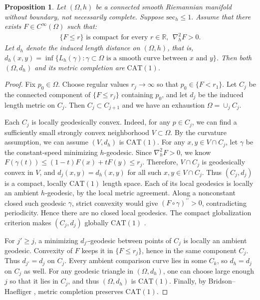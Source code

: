 \documentclass[letterpaper]{amsart}
\newtheorem{prop}[thm]{Proposition}
\theoremstyle{definition}
\theoremstyle{remark}
\begin{document}
\begin{prop}\label{prop-convex-exhaustion}
	Let $(\Omega , h)$ be a connected smooth Riemannian manifold without boundary, not necessarily complete. Suppose $\mathrm{sec}_{h} \leq 1.$ 
Assume that there exists $F \in C ^{\infty}(\Omega )$ such that:
\begin{align*}
	\{F \leq r\} \text{ is compact for every } r \in \mathbb{R},\ \ \nabla ^2_{h} F >0.
\end{align*} 
Let $d_h$ denote the induced length distance on $(\Omega, h) $, that is, $d_{h}(x,y) = \inf \{L_h(\gamma ): \gamma \subset \Omega \text{ is a smooth curve between } x \text{ and } y\} $. Then both $(\Omega , d_{h})$ and its metric completion are $\mathrm{CAT}(1)$.
\end{prop}

\begin{proof}
	Fix $p_0 \in \Omega $. Choose regular values $r_j \to \infty$ so that $p_0 \in \{F < r_1\} $. Let $C_j$ be the connected component of $\{F \leq r_j\} $ containing $p_0$, and let $d_j$ be the induced length metric on $C_j$. Then $C_j \subset C_{j+1}$ and we have an exhaustion $\Omega = \cup _{j} C_j$.

	Each $C_j$ is locally geodesically convex. Indeed, for any $p \in C_j$, we can find a sufficiently small strongly convex neighborhood $V \subset \Omega $. By the curvature assumption, we can assume $(V, d_h)$ is $\mathrm{CAT}(1)$. For any $x, y \in V \cap C_j$, let $\gamma $ be the constant-speed minimizing $h$-geodesic. Since $\nabla ^2_h F >0$, we know $F(\gamma (t) ) \leq (1-t) F(x) + t F(y) \leq r_j$. Therefore, $V \cap C_j$ is geodesically convex in $V$, and $d_j(x, y) = d_h(x, y)$ for all such $x, y \in V \cap C_j$. Thus $(C_j,d_j)$ is a compact, locally $\mathrm{CAT}(1)$ length space. Each of its local geodesics is locally an ambient $h$-geodesic, by the local metric agreement. Along a nonconstant closed such geodesic $\gamma$, strict convexity would give $(F\circ\gamma)^{\prime\prime}>0$, contradicting periodicity. Hence there are no closed local geodesics. The compact globalization criterion makes $(C_j,d_j)$ globally $\mathrm{CAT}(1)$ \cite[Corollary~3.3.4]{notes-AKP}. 

	For $j'\ge j$, a minimizing $d_{j'}$-geodesic between points of $C_j$ is locally an ambient geodesic. Convexity of $F$ keeps it in $\{F\le r_j\}$, hence in the same component $C_j$. Thus $d_{j'}=d_j$ on $C_j$. Every ambient comparison curve lies in some $C_k$, so $d_h=d_j$ on $C_j$ as well. For any geodesic triangle in $(\Omega , d_h)$, one can choose large enough $j$ so that it lies in $C_j$, and thus $(\Omega , d_h)$ is $\mathrm{CAT}(1)$. Finally, by Bridson--Haefliger \cite[Corollary II.3.11]{notes-BH}, metric completion preserves $\mathrm{CAT}(1)$.
\end{proof}
\end{document}
